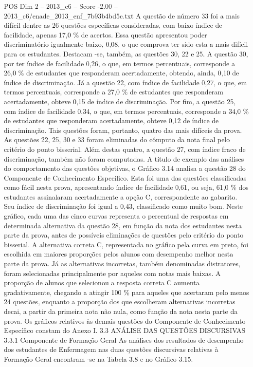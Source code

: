 \begin{textsample}{POS Dim 2 – 2013\_c6 – Score -2.00 – 2013\_c6/enade\_2013\_enf\_7b93b4bd5c.txt}
A questão de número 33 foi a mais difícil dentre as 26 questões específicas consideradas, com baixo índice de facilidade, apenas 17,0 \% de acertos.
Essa questão apresentou poder discriminatório igualmente baixo, 0,08, o que comprova ter sido esta a mais difícil para os estudantes.
Destacam -se, também, as questões 30, 22 e 25.
A questão 30, por ter índice de facilidade 0,26, o que, em termos percentuais, corresponde a 26,0 \% de estudantes que responderam acertadamente, obtendo, ainda, 0,10 de índice de discriminação.
Já a questão 22, com índice de facilidade 0,27, o que, em termos percentuais, corresponde a 27,0 \% de estudantes que responderam acertadamente, obteve 0,15 de índice de discriminação.
Por fim, a questão 25, com índice de facilidade 0,34, o que, em termos percentuais, corresponde a 34,0 \% de estudantes que responderam acertadamente, obteve 0,12 de índice de discriminação.
Tais questões foram, portanto, quatro das mais difíceis da prova.
As questões 22, 25, 30 e 33 foram eliminadas do cômputo da nota final pelo critério do ponto bisserial.
Além destas quatro, a questão 27, com índice fraco de discriminação, também não foram computadas.
A título de exemplo das análises do comportamento das questões objetivas, o Gráfico 3.14 analisa a questão 28 do Componente de Conhecimento Específico.
Esta foi uma das questões classificadas como fácil nesta prova, apresentando índice de facilidade 0,61, ou seja, 61,0 \% dos estudantes assinalaram acertadamente a opção C, correspondente ao gabarito.
Seu índice de discriminação foi igual a 0,43, classificado como muito bom.
Neste gráfico, cada uma das cinco curvas representa o percentual de respostas em determinada alternativa da questão 28, em função da nota dos estudantes nesta parte da prova, antes de possíveis eliminações de questões pelo critério do ponto bisserial.
A alternativa correta C, representada no gráfico pela curva em preto, foi escolhida em maiores proporções pelos alunos com desempenho melhor nesta parte da prova.
Já as alternativas incorretas, também denominadas distratores, foram selecionadas principalmente por aqueles com notas mais baixas.
A proporção de alunos que selecionou a resposta correta C aumenta gradativamente, chegando a atingir 100 \% para aqueles que acertaram pelo menos 24 questões, enquanto a proporção dos que escolheram alternativas incorretas decai, a partir da primeira nota não nula, como função da nota nesta parte da prova.
Os gráficos relativos às demais questões do Componente de Conhecimento Específico constam do Anexo I. 3.3 ANÁLISE DAS QUESTÕES DISCURSIVAS 3.3.1 Componente de Formação Geral As análises dos resultados de desempenho dos estudantes de Enfermagem nas duas questões discursivas relativas à Formação Geral encontram -se na Tabela 3.8 e no Gráfico 3.15.

\end{textsample}
